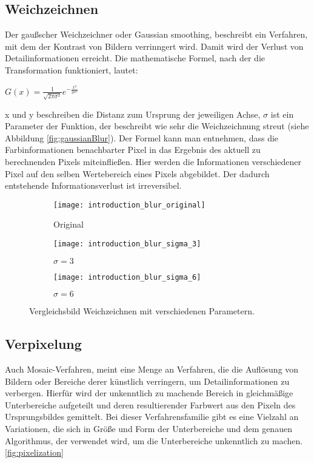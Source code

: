 \documentclass[
12pt, %
a4paper, %
oneside, %
headinclude,footinclude, %
BCOR5mm, %
german]{scrartcl}
\begin{document}
\subsection{Weichzeichnen}
Der gaußscher Weichzeichner oder Gaussian smoothing, beschreibt ein Verfahren, mit dem der Kontrast von Bildern
verrinngert wird. Damit wird der Verlust von Detailinformationen erreicht. Die mathematische Formel, nach der die
Transformation funktioniert, lautet:

\parskip\baselineskip
\(G(x) = \frac{1}{\sqrt{2 \pi \sigma^2}} e^{-\frac{x^2}{2 \sigma^2}}\)
\par
\par

x und y beschreiben die Distanz zum Ursprung der jeweiligen Achse, \(\sigma\) ist ein Parameter der Funktion, der
beschreibt wie sehr die Weichzeichnung streut (siehe Abbildung  \vref*{fig:gaussianBlur}).
Der Formel kann man entnehmen, dass die
Farbinformationen benachbarter Pixel in das Ergebnis des aktuell zu berechnenden Pixels miteinfließen. Hier werden
die Informationen verschiedener Pixel auf den selben Wertebereich eines Pixels abgebildet. Der dadurch entstehende
Informationsverlust ist irreversibel.

\begin{figure}[h]
    \centering
    \begin{subfigure}{0.3\textwidth}
        \texttt{[image: introduction\_blur\_original]}
        \caption{Original}
    \end{subfigure}
    \begin{subfigure}{0.3\textwidth}
        \texttt{[image: introduction\_blur\_sigma\_3]}
        \caption{\(\sigma = 3\)}
    \end{subfigure}
    \begin{subfigure}{0.3\textwidth}
        \texttt{[image: introduction\_blur\_sigma\_6]}
        \caption{\(\sigma = 6\)}
    \end{subfigure}

    \caption{Vergleichsbild Weichzeichnen mit verschiedenen Parametern.}
    \label{fig:gaussianBlur}
\end{figure}

\subsection{Verpixelung}
Auch Mosaic-Verfahren, meint eine Menge an Verfahren, die die Auflösung von Bildern oder Bereiche derer künstlich
verringern, um Detailinformationen zu verbergen. Hierfür wird der unkenntlich zu machende Bereich in gleichmäßige
Unterbereiche aufgeteilt und deren resultierender Farbwert aus den Pixeln des Ursprungsbildes gemittelt. Bei dieser
Verfahrensfamilie gibt es eine Vielzahl an Variationen, die sich in Größe und Form der Unterbereiche und dem genauen
Algorithmus, der verwendet wird, um die Unterbereiche unkenntlich zu machen. \ref{fig:pixelization}
\end{document}
